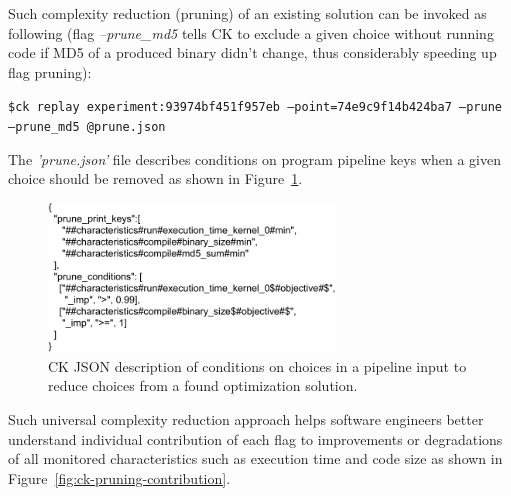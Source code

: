 Such complexity reduction (pruning) of an existing solution can be invoked as following
(flag \textit{--prune\_md5} tells CK to exclude a given choice without running code
if MD5 of a produced binary didn't change, thus considerably speeding up flag pruning):

\begin{flushleft}
\texttt{\$ck replay experiment:93974bf451f957eb --point=74e9c9f14b424ba7 --prune --prune\_md5 @prune.json}
\end{flushleft}

The \textit{'prune.json'} file describes conditions on program pipeline keys 
when a given choice should be removed as shown in Figure~\ref{fig:ck-pruning-meta}.

   \begin{figure}[]
     \centering
      \includegraphics[width=3.0in]
      {ck-assets/e2a106816a4c5093-cropped.pdf} %
     \caption{
       CK JSON description of conditions on choices in a pipeline input to reduce choices from a found optimization solution.
     }
     \label{fig:ck-pruning-meta}
   \end{figure}

Such universal complexity reduction approach helps software engineers better understand
individual contribution of each flag to improvements or degradations of all monitored
characteristics such as execution time and code size as shown in Figure~\ref{fig:ck-pruning-contribution}.

